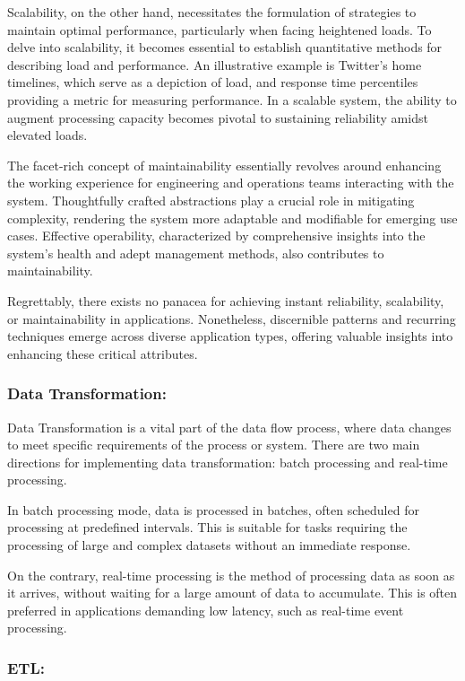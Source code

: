 Scalability, on the other hand, necessitates the formulation of strategies to maintain optimal performance, particularly when facing heightened loads. To delve into scalability, it becomes essential to establish quantitative methods for describing load and performance. An illustrative example is Twitter's home timelines, which serve as a depiction of load, and response time percentiles providing a metric for measuring performance. In a scalable system, the ability to augment processing capacity becomes pivotal to sustaining reliability amidst elevated loads.

The facet-rich concept of maintainability essentially revolves around enhancing the working experience for engineering and operations teams interacting with the system. Thoughtfully crafted abstractions play a crucial role in mitigating complexity, rendering the system more adaptable and modifiable for emerging use cases. Effective operability, characterized by comprehensive insights into the system's health and adept management methods, also contributes to maintainability.

Regrettably, there exists no panacea for achieving instant reliability, scalability, or maintainability in applications. Nonetheless, discernible patterns and recurring techniques emerge across diverse application types, offering valuable insights into enhancing these critical attributes.

\subsubsection*{Data Transformation:}

Data Transformation is a vital part of the data flow process, where data changes to meet specific requirements of the process or system. There are two main directions for implementing data transformation: batch processing and real-time processing.

In batch processing mode, data is processed in batches, often scheduled for processing at predefined intervals. This is suitable for tasks requiring the processing of large and complex datasets without an immediate response.

On the contrary, real-time processing is the method of processing data as soon as it arrives, without waiting for a large amount of data to accumulate. This is often preferred in applications demanding low latency, such as real-time event processing.

\subsubsection*{ETL:}

